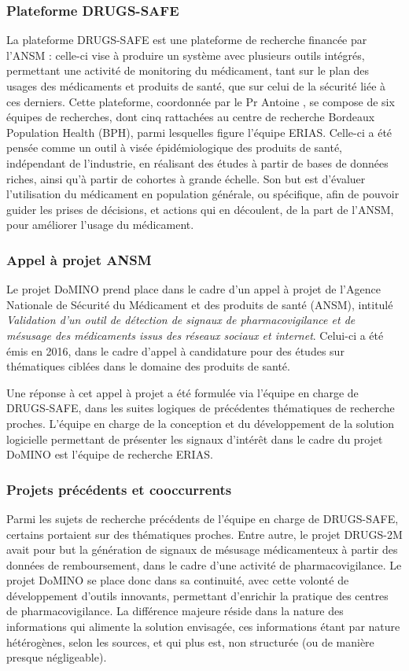 \documentclass[a4paper, 12pt, openany, oneside, abstract=on]{article} %
\begin{document}
\subsubsection{Plateforme DRUGS-SAFE}
La plateforme DRUGS-SAFE est une plateforme de recherche financée par l'ANSM : celle-ci vise à produire un système avec plusieurs outils intégrés, permettant une activité de monitoring du médicament, tant sur le plan des usages des médicaments et produits de santé, que sur celui de la sécurité liée à ces derniers.
Cette plateforme, coordonnée par le Pr Antoine , se compose de six équipes de recherches, dont cinq rattachées au centre de recherche Bordeaux Population Health (BPH), parmi lesquelles figure l'équipe ERIAS.
Celle-ci a été pensée comme un outil à visée épidémiologique des produits de santé, indépendant de l'industrie, en réalisant des études à partir de bases de données riches, ainsi qu'à partir de cohortes à grande échelle\cite{ANSM2014}. Son but est d'évaluer l'utilisation du médicament en population générale, ou spécifique, afin de pouvoir guider les prises de décisions, et actions qui en découlent, de la part de l'ANSM, pour améliorer l'usage du médicament\cite{DRUGS-SAFEa}.

\subsubsection{Appel à projet ANSM}
\label{appelProjet}
Le projet DoMINO prend place dans le cadre d'un appel à projet de l'Agence Nationale de Sécurité du Médicament et des produits de santé (ANSM), intitulé \emph{Validation d’un outil de détection de signaux de pharmacovigilance et de mésusage des médicaments issus des réseaux sociaux et internet}. Celui-ci a été émis en 2016, dans le cadre d'appel à candidature pour des études sur thématiques ciblées dans le domaine des produits de santé\cite{ANSM}.

Une réponse à cet appel à projet a été formulée via l'équipe en charge de DRUGS-SAFE, dans les suites logiques de précédentes thématiques de recherche proches. L'équipe en charge de la conception et du développement de la solution logicielle permettant de présenter les signaux d'intérêt dans le cadre du projet DoMINO est l'équipe de recherche ERIAS.

\subsubsection{Projets précédents et cooccurrents}
Parmi les sujets de recherche précédents de l'équipe en charge de DRUGS-SAFE, certains portaient sur des thématiques proches. Entre autre, le projet DRUGS-2M avait pour but la génération de signaux de mésusage médicamenteux à partir des données de remboursement, dans le cadre d'une activité de pharmacovigilance\cite{Le2011}.
Le projet DoMINO se place donc dans sa continuité, avec cette volonté de développement d'outils innovants, permettant d'enrichir la pratique des centres de pharmacovigilance. 
La différence majeure réside dans la nature des informations qui alimente la solution envisagée, ces informations étant par nature hétérogènes, selon les sources, et qui plus est, non structurée (ou de manière presque négligeable).
\end{document}
